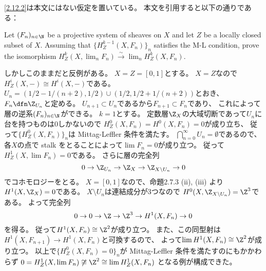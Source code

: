 \documentclass[uplatex,dvipdfmx]{jsarticle}
\begin{document}
\begin{rem*}
  \ref{2.12.2}は本文にはない仮定を置いている。
  本文を引用すると以下の通りである：

  Let \((F_n)_{n\in \N}\) be a projective system of sheaves on \(X\) and
  let \(Z\) be a locally closed subset of \(X\).
  Assuming that \(\{H^{k-1}_Z(X,F_n)\}_n\) satisfies the M-L condition,
  prove the isomorphism
  \(H^k_Z(X,\lim_n F_n) \xrightarrow{\sim} \lim_n H^k_Z(X,F_n)\).

  しかしこのままだと反例がある。
  \(X=Z=[0,1]\)とする。
  \(X=Z\)なので\(H^i_Z(X,-)\cong H^i(X,-)\)である。
  \(U_n=(1/2-1/(n+2),1/2)\cup (1/2,1/2+1/(n+2))\)とおき、
  \(F_n\dfn \Z_{U_n}\)と定める。
  \(U_{n+1}\subset U_n\)であるから\(F_{n+1}\subset F_n\)であり、
  これによって層の逆系\((F_n)_{n\in \N}\)ができる。
  \(k=1\)とする。
  定数層\(\Z_X\)の大域切断であって\(U_n\)に台を持つものは\(0\)しかないので
  \(H^0_Z(X,F_n)=H^0(X,F_n)=0\)が成り立ち、
  従って\(\{H^0_Z(X,F_n)\}_n\)は Mittag-Leffler 条件を満たす。
  \(\bigcap_{n=0}^{\infty}U_n=\emptyset\)であるので、
  各\(X\)の点で stalk をとることによって\(\lim F_n=0\)が成り立つ。
  従って\(H^1_Z(X,\lim F_n)=0\)である。
  さらに層の完全列
  \[0\to \Z_{U_n}\to \Z_X\to \Z_{X\setminus U_n}\to 0\]
  でコホモロジーをとる。
  \(X=[0,1]\)なので、命題2.7.3 (ii), (iii) より\(H^1(X,\Z_X)=0\)である。
  \(X\setminus U_n\)は連結成分が3つなので
  \(H^0(X,\Z_{X\setminus U_n})=\Z^3\)である。
  よって完全列
  \[
  0\to 0\to \Z \to \Z^3 \to H^1(X,F_n) \to 0
  \]
  を得る。
  従って\(H^1(X,F_n)\cong \Z^2\)が成り立つ。
  また、この同型射は\(H^1(X,F_{n+1})\to H^1(X,F_n)\)と可換するので、
  よって\(\lim H^1(X,F_n)\cong \Z^2\)が成り立つ。
  以上で\(\{H^0_Z(X,F_n)=0\}_n\)が Mittag-Leffler 条件を満たすのにもかかわらず
  \(0=H^1_Z(X,\lim F_n) \not\cong \Z^2\cong \lim H^1_Z(X,F_n)\)
  となる例が構成できた。
\end{rem*}
\end{document}

